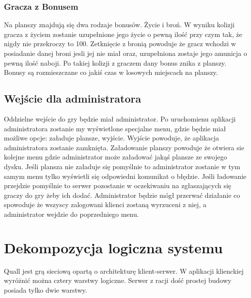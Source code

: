 \documentclass[12pt,a4paper,twoside]{article}
\begin{document}
\subsubsection{Gracza z Bonusem}
Na planszy znajdują się dwa rodzaje bonusów. Życie i broń. W wyniku kolizji gracza z życiem zostanie uzupełnione jego życie o pewną ilość przy czym tak, że nigdy nie przekroczy to 100. Zetknięcie z bronią powoduje że gracz wchodzi w posiadanie danej broni jesli jej nie miał oraz, uzupełniona zostaje jego amunicja o pewną ilość naboji. Po takiej kolizji z graczem dany bonus znika z planszy. Bonusy są rozmieszczane co jakiś czas w losowych miejscach na planszy. 

\subsection{Wejście dla administratora}
Oddzielne wejście do gry będzie miał administrator. Po uruchomienu aplikacji administratora zostanie my wyświetlone specjalne menu, gdzie będzie miał możliwe opcje: załaduje plansze, wyjście. Wyjście powoduje, że aplikacja administratora zostanie zamknięta. Załadowanie planszy powoduje że otwiera sie kolejne menu gdzie administrator może załadować jakąś plansze ze swojego dysku. Jeśli plansza nie załaduje się pomyślnie to administrator zostanie w tym samym menu tylko wyświetli się odpowiedni komunikat o błędzie. Jeśli ładowanie przejdzie pomyślnie to serwer pozostanie w oczekiwaniu na zgłaszających się graczy do gry żeby ich dodać. Administrator będzie mógł przerwać działanie co spowoduje że wszyscy zalogowani klienci zostaną wyrzuceni z niej, a administrator wejdzie do poprzedniego menu.

\section{Dekompozycja logiczna systemu}


Quall jest grą sieciową opartą o architekturę klient-serwer. W aplikacji klienckiej wyróżnić można cztery warstwy logiczne. Serwer z racji dość prostej budowy posiada tylko dwie warstwy.
\end{document}
